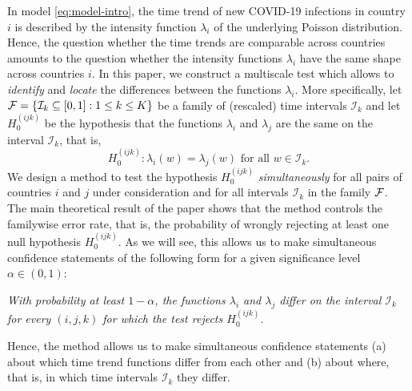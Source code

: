 \documentclass[a4paper,12pt]{article}
\numberwithin{equation}{section}
\begin{document}
In model \eqref{eq:model-intro}, the time trend of new COVID-19 infections in country $i$ is described by the intensity function $\lambda_i$ of the underlying Poisson distribution. Hence, the question whether the time trends are comparable across countries amounts to the question whether the intensity functions $\lambda_i$ have the same shape across countries $i$. In this paper, we construct a multiscale test which allows to \textit{identify} and \textit{locate} the differences between the functions $\lambda_i$. More specifically, let $\mathcal{F} = \{ \mathcal{I}_k \subseteq[0,1] : 1 \le k \le K \}$ be a family of (rescaled) time intervals $\mathcal{I}_k$ and let $H_0^{(ijk)}$ be the hypothesis that the functions $\lambda_i$ and $\lambda_j$ are the same on the interval $\mathcal{I}_k$, that is, 
\[ H_0^{(ijk)}: \lambda_i(w) = \lambda_j(w) \text{ for all } w \in \mathcal{I}_k. \]
We design a method to test the hypothesis $H_0^{(ijk)}$ \textit{simultaneously} for all pairs of countries $i$ and $j$ under consideration and for all intervals $\mathcal{I}_k$ in the family $\mathcal{F}$. The main theoretical result of the paper shows that the method controls the familywise error rate, that is, the probability of wrongly rejecting at least one null hypothesis $H_0^{(ijk)}$. As we will see, this allows us to make simultaneous confidence statements of the following form for a given significance level $\alpha \in (0,1)$: 
\begin{center}
\begin{minipage}[c][1.25cm][c]{13cm}
\textit{With probability at least $1-\alpha$, the functions $\lambda_i$ and $\lambda_j$ differ on the interval $\mathcal{I}_k$ for every $(i,j,k)$ for which the test rejects $H_0^{(ijk)}$.}
\end{minipage}
\end{center}
Hence, the method allows us to make simultaneous confidence statements (a) about which time trend functions differ from each other and (b) about where, that is, in which time intervals $\mathcal{I}_{k}$ they differ. 
\end{document}

